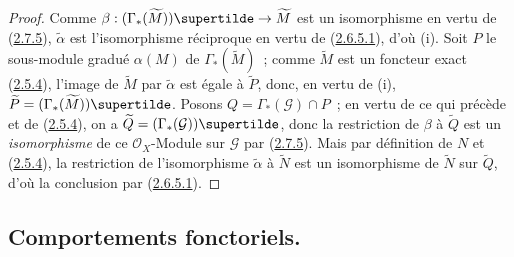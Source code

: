 \begin{proof}
Comme $\beta:(\Gamma_*(\widetilde{M}))\supertilde
\to\widetilde{M}$ est un isomorphisme en vertu de
(\hyperref[II.2.7.5-fr]{2.7.5}), $\widetilde{\alpha}$ est l'isomorphisme
réciproque en vertu de (\hyperref[II.2.6.5.1-fr]{2.6.5.1}), d'où (i). Soit
$P$ le sous-module gradué $\alpha(M)$ de $\Gamma_*(\widetilde{M})$~; comme
$\widetilde{M}$ est un foncteur exact
(\hyperref[II.2.5.4-fr]{2.5.4}), l'image de $\widetilde{M}$ par
$\widetilde{\alpha}$ est égale à $\widetilde{P}$, donc, en vertu de (i),
$\widetilde{P}=(\Gamma_*(\widetilde{M}))\supertilde$. Posons
$Q=\Gamma_*(\mathcal{G})\cap P$~; en vertu de ce qui précède et de
(\hyperref[II.2.5.4-fr]{2.5.4}), on a
$\widetilde{Q}=(\Gamma_*(\mathcal{G}))\supertilde$, donc la
restriction de $\beta$ à $\widetilde{Q}$ est un \emph{isomorphisme} de ce
$\mathcal{O}_X$-Module sur $\mathcal{G}$ par
(\hyperref[II.2.7.5-fr]{2.7.5}). Mais par définition de $N$ et
(\hyperref[II.2.5.4-fr]{2.5.4}), la restriction de l'isomorphisme
$\widetilde{\alpha}$ à $\widetilde{N}$ est un isomorphisme de $\widetilde{N}$
sur $\widetilde{Q}$, d'où la conclusion par
(\hyperref[II.2.6.5.1-fr]{2.6.5.1}).
\end{proof}

\subsection{Comportements fonctoriels.}
\label{subsection:II.2.8-fr}

